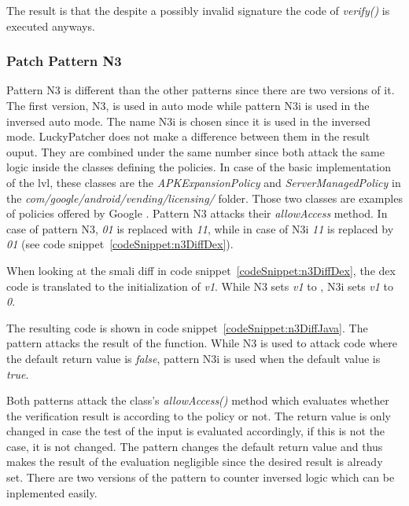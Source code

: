 The result is that the despite a possibly invalid signature the code of \textit{verify()} is executed anyways.

\subsubsection{Patch Pattern N3}
Pattern N3 is different than the other patterns since there are two versions of it.
The first version, N3, is used in auto mode while pattern N3i is used in the inversed auto mode.
The name N3i is chosen since it is used in the inversed mode.
LuckyPatcher does not make a difference between them in the result ouput.
They are combined under the same number since both attack the same logic inside the classes defining the policies.
In case of the basic implementation of the \gls{lvl}, these classes are the \textit{APKExpansionPolicy} and \textit{ServerManagedPolicy} in the  \textit{com/google/android/vending/licensing/} folder.
Those two classes are examples of policies offered by Google \cite{developersLicensingReference}.
Pattern N3 attacks their \textit{allowAccess} method.
\newline
In case of pattern N3, \textit{01} is replaced with \textit{11}, while in case of N3i \textit{11} is replaced by \textit{01} (see code snippet~\ref{codeSnippet:n3DiffDex}).
\newline

When looking at the smali diff in code snippet~\ref{codeSnippet:n3DiffDex}, the dex code is translated to the initialization of \textit{v1}.
While N3 sets \textit{v1} to , N3i sets \textit{v1} to \textit{0}.
\newline

The resulting code is shown in code snippet~\ref{codeSnippet:n3DiffJava}.
The pattern attacks the result of the function.
While N3 is used to attack code where the default return value is \textit{false}, pattern N3i is used when the default value is \textit{true}.
\newline

Both patterns attack the class's \textit{allowAccess()} method which evaluates whether the verification result is according to the policy or not.
The return value is only changed in case the test of the input is evaluated accordingly, if this is not the case, it is not changed.
The pattern changes the default return value and thus makes the result of the evaluation negligible since the desired result is already set.
There are two versions of the pattern to counter inversed logic which can be inplemented easily.

